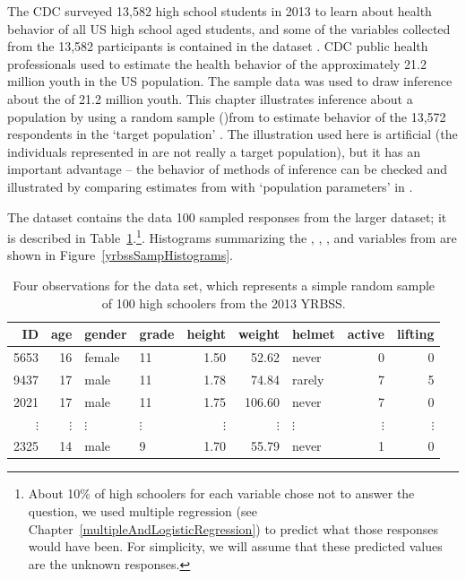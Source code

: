 \begin{spacing}{1.5}


The CDC surveyed 13,582 high school students in 2013 to learn about health behavior of all US high school aged students, and some of the variables collected from the 13,582 participants is contained in the dataset .  CDC public health professionals used  to estimate the health behavior of the approximately 21.2 million youth in the US population.  The sample data  was used to draw inference about the  of 21.2 million youth.  This chapter illustrates inference about a population by using a random sample ()from  to estimate behavior of the 13,572 respondents in the `target population' . The illustration used here is artificial (the individuals represented in  are not really a target population), but it has an important advantage -- the behavior of methods of inference can be checked and illustrated by comparing estimates from  with `population parameters' in .

The dataset  contains the data 100 sampled responses from the larger dataset; it is described in Table~\ref{yrbssSampDF}.\footnote{About 10\% of high schoolers for each variable chose not to answer the question, we used multiple regression (see Chapter~\ref{multipleAndLogisticRegression}) to predict what those responses would have been. For simplicity, we will assume that these predicted values are the unknown responses.}. Histograms summarizing the , , , and  variables from  are shown in Figure~\ref{yrbssSampHistograms}.

\begin{table}
\centering
\begin{tabular}{rrllrrlrr}
  \hline
ID & age & gender & grade & height & weight & helmet & active & lifting \\ 
  \hline
5653 &  16 & female & 11 & 1.50 & 52.62 & never &   0 &   0 \\ 
  9437 &  17 & male & 11 & 1.78 & 74.84 & rarely &   7 &   5 \\ 
  2021 &  17 & male & 11 & 1.75 & 106.60 & never &   7 &   0 \\ 
  $\vdots$ & $\vdots$ & $\vdots$ & $\vdots$ & $\vdots$ & $\vdots$ & $\vdots$ & $\vdots$ & $\vdots$ \\
  2325 &  14 & male & 9 & 1.70 & 55.79 & never &   1 &   0 \\ 
   \hline
\end{tabular}
\caption{Four observations for the  data set, which represents a simple random sample of 100 high schoolers from the 2013 YRBSS.}
\label{yrbssSampDF}
\end{table}



\end{spacing}
